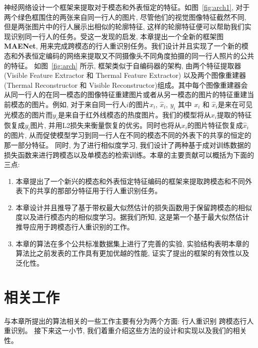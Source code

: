 神经网络设计一个框架来提取对于模态和外表恒定的特征。如图~\ref{fig:arch1}, 对于两个绿色框围住的两张来自同一行人的图片, 尽管他们的视觉图像特征截然不同, 但是两张图片中的行人展示出相似的轮廓特征, 这样的轮廓特征便可以帮助我们实现识别同一行人的任务。受这一发现的启发, 本章提出一个全新的框架图 \textbf{MAENet}, 用来完成跨模态的行人重识别任务。我们设计并且实现了一个新的模态和外表恒定编码的网络来提取又不同摄像头不同角度拍摄的同一行人照片的公共的特征。 如图~\ref{fig:arch} 所示, 框架类似于自编码器的架构, 由两个特征提取器 (Visible Feature Extractor 和 Thermal Feature Extractor) 以及两个图像重建器 (Thermal Reconstructor 和 Visible Reconstructor)组成。其中每个图像重建器会从同一行人的在同一模态的图像特征重建图片或者从另一模态的图片的特征重建当前模态的图片。例如, 对于来自同一行人$i$的图片$x_i$, $\hat{x}_i$, $y_i$ 其中 $x_i$ 和 $\hat{x}_i$是来在可见光模态的图片而$y_i$是来自于红外线模态的热度图片。我们的模型将从$x_i$提取的特征恢复成$y_i$图片, 并用L2损失来衡量恢复的优劣。同时也将从$x_i$的图片特征恢复成$\hat{x}_i$的图片, 从而促使模型学习到同一行人在不同的模态不同的外表下的共享的恒定的那一部分特征。
同时, 为了进行相似度学习, 我们设计了两种基于成对训练数据的损失函数来进行跨模态以及单模态的检索训练。本章的主要贡献可以概括为下面的三点:
\begin{enumerate}
    \item 本章提出了一个新兴的模态和外表恒定特征编码的框架来提取跨模态和不同外表下的共享的那部分特征用于行人重识别任务。
    \item 本章设计并且推导了基于带权最大似然估计的损失函数用于保留跨模态的相似度以及进行模态内的相似度学习。据我们所知, 这是第一个基于最大似然估计推导应用于跨模态行人重识别的工作。
    \item 本章的算法在多个公共标准数据集上进行了完善的实验, 实验结构表明本章的算法比之前发表的工作具有更加优越的性能, 证实了提出的框架的有效性以及泛化性。
\end{enumerate}

\section{相关工作}
与本章所提出的算法相关的一些工作主要有分为两个方面: 行人重识别 跨模态行人重识别。 接下来这一小节, 我们着重介绍这些方法的设计和实现以及我们的相关性。
